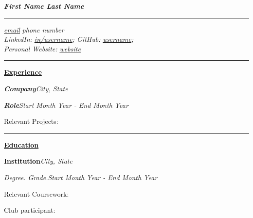 \documentclass[11pt,a4paper]{article}
\newcommand{\resumerule}{%
    \par\noindent\hspace*{3pt}%
    \textcolor{rulegray}{\rule{\dimexpr\textwidth-3pt\relax}{1pt}}\par
}
\newcommand{\resumesection}[1]{%
    \par\vspace{-1.7pt}%
    \resumerule
    \vspace{0.5pt}%
    \noindent\textbf{\underline{#1}}\par
}
\begin{document}
\vspace*{-10.8pt}
{\centering\bfseries\itshape First Name Last Name\par}

\vspace{-1.9pt}
\resumerule
\vspace{1.3pt}

{\centering
    \href{mailto:email@example.com}{\itshape\underline{email}}
    \textbullet{} \itshape phone number\\[-0.62pt]
    LinkedIn: \href{https://www.linkedin.com/in/username}{\itshape\underline{in/username}};
    GitHub: \href{https://github.com/username}{\itshape\underline{username}};\\[-0.62pt]
    Personal Website: \href{https://website.com}{\itshape\underline{website}}\par
}

\resumesection{Experience}

\noindent\textbf{\textit{Company}}\hfill\textit{City, State}\par
\noindent\textbf{\textit{Role}}\hfill\textit{Start Month Year - End Month Year}\par

\begin{resumelist}
    \item \textellipsis
\end{resumelist}

Relevant Projects:
\begin{resumelist}
    \item \textellipsis
\end{resumelist}

\textellipsis

\resumesection{Education}

\noindent\textbf{Institution}\hfill\textit{City, State}\par
\noindent\textit{Degree. Grade.}\hfill\textit{Start Month Year - End Month Year}\par

Relevant Coursework:
\begin{resumelist}
    \item \textellipsis
\end{resumelist}

Club participant:
\begin{resumelist}
    \item \textellipsis
\end{resumelist}
\end{document}
